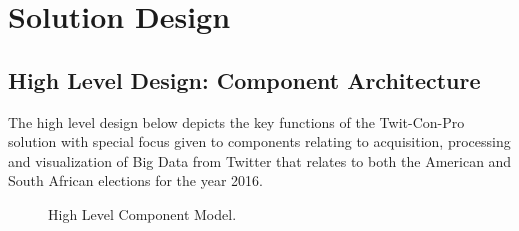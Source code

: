 \documentclass[12pt]{article} %
\begin{document}
	\section{Solution Design}
		
	\subsection{High Level Design: Component Architecture}
	
	The high level design below depicts the key functions of the Twit-Con-Pro solution with special focus given to components relating to acquisition, processing and visualization of Big Data from Twitter that relates to both the American and South African elections for the year 2016.
	
		\begin{figure}[H] %
			\caption{High Level Component Model.}
			\label{fig:speciation}
		\end{figure}
	
\end{document}
